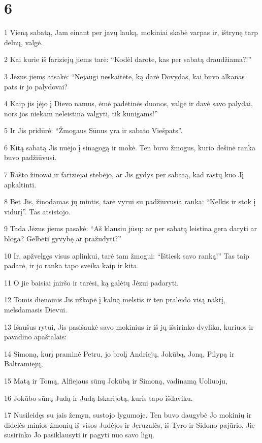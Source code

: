 \chapter{6}


\par 1 Vieną sabatą, Jam einant per javų lauką, mokiniai skabė varpas ir, ištrynę tarp delnų, valgė. 
\par 2 Kai kurie iš fariziejų jiems tarė: “Kodėl darote, kas per sabatą draudžiama?!” 
\par 3 Jėzus jiems atsakė: “Nejaugi neskaitėte, ką darė Dovydas, kai buvo alkanas pats ir jo palydovai? 
\par 4 Kaip jis įėjo į Dievo namus, ėmė padėtinės duonos, valgė ir davė savo palydai, nors jos niekam neleistina valgyti, tik kunigams!” 
\par 5 Ir Jis pridūrė: “Žmogaus Sūnus yra ir sabato Viešpats”. 
\par 6 Kitą sabatą Jis nuėjo į sinagogą ir mokė. Ten buvo žmogus, kurio dešinė ranka buvo padžiūvusi. 
\par 7 Rašto žinovai ir fariziejai stebėjo, ar Jis gydys per sabatą, kad rastų kuo Jį apkaltinti. 
\par 8 Bet Jis, žinodamas jų mintis, tarė vyrui su padžiūvusia ranka: “Kelkis ir stok į vidurį”. Tas atsistojo. 
\par 9 Tada Jėzus jiems pasakė: “Aš klausiu jūsų: ar per sabatą leistina gera daryti ar bloga? Gelbėti gyvybę ar pražudyti?” 
\par 10 Ir, apžvelgęs visus aplinkui, tarė tam žmogui: “Ištiesk savo ranką!” Tas taip padarė, ir jo ranka tapo sveika kaip ir kita. 
\par 11 O jie baisiai įniršo ir tarėsi, ką galėtų Jėzui padaryti. 
\par 12 Tomis dienomis Jis užkopė į kalną melstis ir ten praleido visą naktį, melsdamasis Dievui. 
\par 13 Išaušus rytui, Jis pasišaukė savo mokinius ir iš jų išsirinko dvylika, kuriuos ir pavadino apaštalais: 
\par 14 Simoną, kurį praminė Petru, jo brolį Andriejų, Jokūbą, Joną, Pilypą ir Baltramiejų, 
\par 15 Matą ir Tomą, Alfiejaus sūnų Jokūbą ir Simoną, vadinamą Uoliuoju, 
\par 16 Jokūbo sūnų Judą ir Judą Iskarijotą, kuris tapo išdaviku. 
\par 17 Nusileidęs su jais žemyn, sustojo lygumoje. Ten buvo daugybė Jo mokinių ir didelės minios žmonių iš visos Judėjos ir Jeruzalės, iš Tyro ir Sidono pajūrio. Jie susirinko Jo pasiklausyti ir pagyti nuo savo ligų. 
